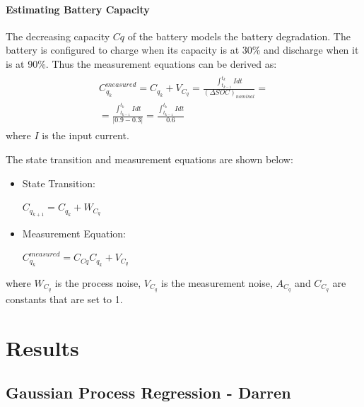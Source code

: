 \paragraph{Estimating Battery Capacity}
The decreasing capacity $Cq$ of the battery models the battery degradation. The battery is configured to charge when its capacity is at 30\% and discharge when it is at 90\%. Thus the measurement equations can be derived as:
\begin{equation}
  \label{state transition_2}
\begin{aligned}
\begin{split}
 C_{q_k}^{measured} = C_{q_{k}} + V_{C_{q}} =  \frac{\int_{t_{k-1}}^{t_{k}}Idt} {(\Delta SOC)_{nominal}} = \\ = \frac{\int_{t_{k-1}}^{t_{k}}Idt} {\left|0.9 - 0.3 \right|} = \frac{\int_{t_{k-1}}^{t_{k}}Idt} {0.6}
 \end{split}
 \end{aligned}
\end{equation}
where $I$ is the input current.

The state transition and measurement equations are shown below:
\begin{itemize}
\item State Transition: 
	\begin{center}
	$C_{q_{k+1}} = C_{q_{k}} + W_{C_{q}}$
	\end{center}
\item Measurement Equation: 
\begin{center}
 $C_{q_k}^{measured} = C_{C{q}}C_{q_{k}} + V_{C_{q}}$
\end{center}
\end{itemize}

where $W_{C_q}$ is the process noise, $V_{C_q}$ is the measurement noise, $A_{C_q}$ and $C_{C_q}$ are constants that are set to 1.

\section{Results}
\subsection{Gaussian Process Regression - Darren}

